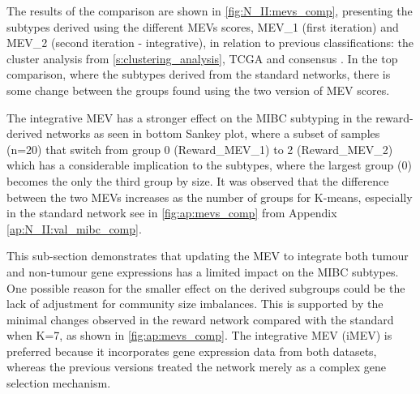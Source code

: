 The results of the comparison are shown in \cref{fig:N_II:mevs_comp}, presenting the subtypes derived using the different MEVs scores, MEV\_1 (first iteration) and MEV\_2 (second iteration - integrative), in relation to previous classifications: the cluster analysis from \cref{s:clustering_analysis}, TCGA and consensus \citep{Robertson2017-mg,Kamoun2020-tj}. In the top comparison, where the subtypes derived from the standard networks, there is some change between the groups found using the two version of MEV scores.

The integrative MEV has a stronger effect on the MIBC subtyping in the reward-derived networks as seen in bottom Sankey plot, where a subset of samples (n=20) that switch from group 0 (Reward\_MEV\_1) to 2 (Reward\_MEV\_2) which has a considerable implication to the subtypes, where the largest group (0) becomes the only the third group by size. It was observed that the difference between the two MEVs increases as the number of groups for K-means, especially in the standard network see in \cref{fig:ap:mevs_comp} from Appendix \cref{ap:N_II:val_mibc_comp}.  

This sub-section demonstrates that updating the MEV to integrate both tumour and non-tumour gene expressions has a limited impact on the MIBC subtypes. One possible reason for the smaller effect on the derived subgroups could be the lack of adjustment for community size imbalances. This is supported by the minimal changes observed in the reward network compared with the standard when K=7, as shown in \cref{fig:ap:mevs_comp}. The integrative MEV (iMEV) is preferred because it incorporates gene expression data from both datasets, whereas the previous versions treated the network merely as a complex gene selection mechanism.


